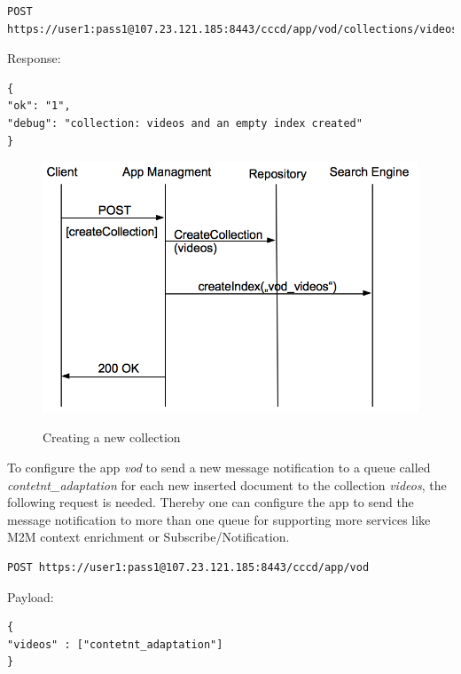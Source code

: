 \begin{code}
\begin{verbatim}
POST https://user1:pass1@107.23.121.185:8443/cccd/app/vod/collections/videos
\end{verbatim}
Response:
\begin{verbatim}
{
"ok": "1",
"debug": "collection: videos and an empty index created"
}
\end{verbatim}
\end{code}

\begin{figure}[htb]
  \centering
  \includegraphics[scale=0.6]{flows/newCollectionFlow.png}\\
  \caption{Creating a new collection}
  \label{fig:newCollection}
\end{figure}

To configure the app \textit{vod} to send a new message notification to a queue called \textit{contetnt\_adaptation} for each new inserted document to the collection \textit{videos}, the following request is needed. Thereby one can configure the app to send the message notification to more than one queue for supporting more services like M2M context enrichment or Subscribe/Notification.

\begin{code}
\begin{verbatim}
POST https://user1:pass1@107.23.121.185:8443/cccd/app/vod
\end{verbatim}
Payload:
\begin{verbatim}
{
"videos" : ["contetnt_adaptation"]
}
\end{verbatim}
\end{code}

